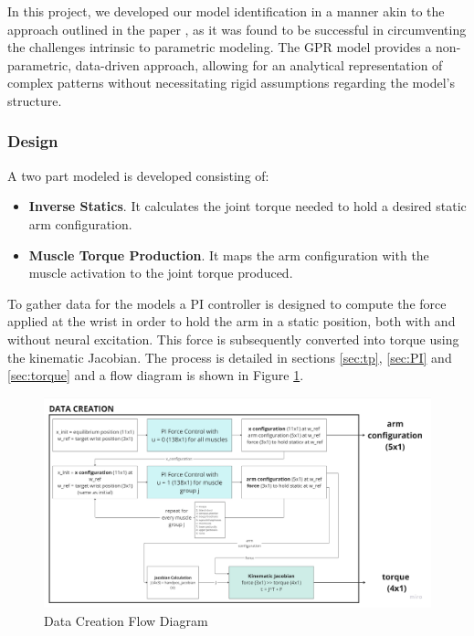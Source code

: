 In this project, we developed our model identification in a manner akin to the approach outlined in the paper \cite{QSC}, as it was found to be successful in circumventing the challenges intrinsic to parametric modeling. The GPR model provides a non-parametric, data-driven approach, allowing for an analytical representation of complex patterns without necessitating rigid assumptions regarding the model's structure.

\newpage
\subsubsection{Design}

 A two part modeled is developed consisting of:

 \begin{itemize}
     \item \textbf{Inverse Statics}. It calculates the joint torque needed to hold a desired static arm configuration.
     \item \textbf{Muscle Torque Production}. It maps the arm configuration with the muscle activation to the joint torque produced. 
 \end{itemize}

To gather data for the models a PI controller is designed to compute the force applied at the wrist in order to hold the arm in a static position, both with and without neural excitation. This force is subsequently converted into torque using the kinematic Jacobian. The process is detailed in sections \ref{sec:tp}, \ref{sec:PI} and \ref{sec:torque} and a flow diagram is shown in Figure \ref{fig:datacreation}. 

\begin{figure}[h!]
    \centering
    \includegraphics[width=1\textwidth]{Pictures/Model/DataCreation.jpg}
    \caption{Data Creation Flow Diagram}
    \label{fig:datacreation}
\end{figure}


